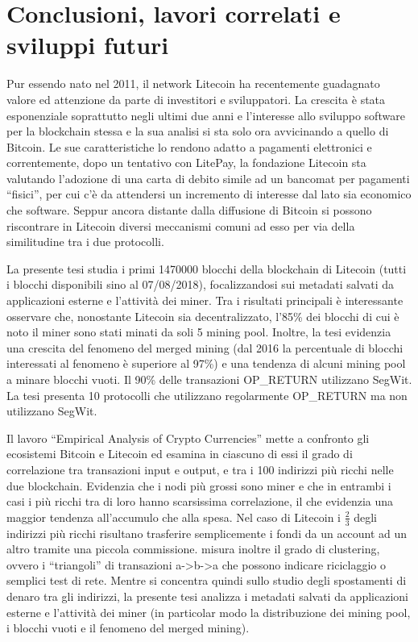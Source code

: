 \chapter{Conclusioni, lavori correlati e sviluppi futuri}

Pur essendo nato nel 2011, il network Litecoin ha recentemente guadagnato valore ed attenzione da parte di investitori e sviluppatori. La crescita è stata esponenziale soprattutto negli ultimi due anni e l’interesse allo sviluppo software per la blockchain stessa e la sua analisi si sta solo ora avvicinando a quello di Bitcoin. Le sue caratteristiche lo rendono adatto a pagamenti elettronici e correntemente, dopo un tentativo con LitePay, la fondazione Litecoin sta valutando l’adozione di una carta di debito simile ad un bancomat per pagamenti “fisici”, per cui c’è da attendersi un incremento di interesse dal lato sia economico che software. Seppur ancora distante dalla diffusione di Bitcoin si possono riscontrare in Litecoin diversi meccanismi comuni ad esso per via della similitudine tra i due protocolli.


La presente tesi studia i primi 1470000 blocchi della blockchain di Litecoin (tutti i blocchi disponibili sino al 07/08/2018),
focalizzandosi sui metadati salvati da applicazioni esterne e l'attività dei miner.
Tra i risultati principali è interessante osservare che, nonostante Litecoin sia decentralizzato, l'85\% dei blocchi di cui è noto il miner sono stati minati da soli 5 mining pool.
Inoltre, la tesi evidenzia una crescita del fenomeno del merged mining (dal 2016 la percentuale di blocchi interessati al fenomeno è superiore al 97\%) e una tendenza di alcuni mining pool a minare blocchi vuoti. Il 90\% delle transazioni OP\_RETURN utilizzano SegWit. La tesi presenta 10 protocolli che utilizzano regolarmente OP\_RETURN ma non utilizzano SegWit.


Il lavoro “Empirical Analysis of Crypto Currencies”\cite{relatedwork} mette a confronto gli ecosistemi Bitcoin e Litecoin ed esamina in ciascuno di essi il grado di correlazione tra transazioni input e output, e tra i 100 indirizzi più ricchi nelle due blockchain. Evidenzia che i nodi più grossi sono miner e che in entrambi i casi i più ricchi tra di loro hanno scarsissima correlazione, il che evidenzia una maggior tendenza all’accumulo che alla spesa. Nel caso di Litecoin i $\frac{2}{3}$ degli indirizzi più ricchi risultano trasferire semplicemente i fondi da un account ad un altro tramite una piccola commissione. \cite{relatedwork} misura inoltre il grado di clustering, ovvero i “triangoli” di transazioni a->b->a che possono indicare riciclaggio o semplici test di rete.
Mentre \cite{relatedwork} si concentra quindi sullo studio degli spostamenti di denaro tra gli indirizzi, la presente tesi analizza i metadati salvati da applicazioni esterne e l'attività dei miner (in particolar modo la distribuzione dei mining pool, i blocchi vuoti e il fenomeno del merged mining).



